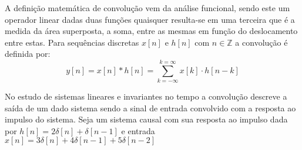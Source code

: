 \begin{center}
\end{center}


A definição matemática de convolução vem da análise funcional, sendo este um operador linear dadas duas funções quaisquer resulta-se em uma terceira que é a medida da área superposta, a soma, entre as mesmas em função do deslocamento entre estas. \noindent Para sequências discretas $x[n]$ e $h[n]$ com $n \in \mathbb{Z}$ a convolução é definida por: $$\displaystyle y[n] = x[n] * h[n] = \sum_{k = -\infty}^{k = \infty} x[k] \cdot h[n -k]$$

No estudo de sistemas lineares e invariantes no tempo a convolução descreve a saída de um dado sistema sendo a sinal de entrada convolvido com a resposta ao impulso do sistema. Seja um sistema causal com sua resposta ao impulso dada por $h[n] = 2\delta[n] + \delta[n-1]$ e entrada $x[n] = 3\delta[n] + 4\delta[n-1] + 5\delta[n-2]$

